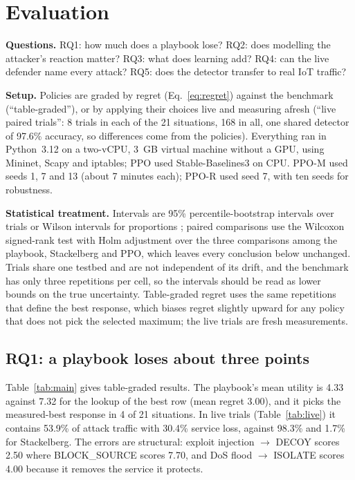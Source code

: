 \documentclass[conference]{IEEEtran}
\begin{document}
\section{Evaluation}
\label{sec:eval}
\textbf{Questions.} RQ1: how much does a playbook lose? RQ2: does modelling the attacker's reaction matter? RQ3: what does learning add? RQ4: can the live defender name every attack? RQ5: does the detector transfer to real IoT traffic?

\textbf{Setup.} Policies are graded by regret (Eq.~\ref{eq:regret}) against the benchmark (``table-graded''), or by applying their choices live and measuring afresh (``live paired trials'': 8 trials in each of the 21 situations, 168 in all, one shared detector of 97.6\% accuracy, so differences come from the policies). Everything ran in Python~3.12 on a two-vCPU, 3~GB virtual machine without a GPU, using Mininet, Scapy and iptables; PPO used Stable-Baselines3 on CPU. PPO-M used seeds 1, 7 and 13 (about 7 minutes each); PPO-R used seed 7, with ten seeds for robustness.

\textbf{Statistical treatment.} Intervals are 95\% percentile-bootstrap intervals over trials \cite{efron1993bootstrap} or Wilson intervals for proportions \cite{wilson1927probable}; paired comparisons use the Wilcoxon signed-rank test \cite{wilcoxon1945individual} with Holm adjustment \cite{holm1979simple} over the three comparisons among the playbook, Stackelberg and PPO, which leaves every conclusion below unchanged. Trials share one testbed and are not independent of its drift, and the benchmark has only three repetitions per cell, so the intervals should be read as lower bounds on the true uncertainty. Table-graded regret uses the same repetitions that define the best response, which biases regret slightly upward for any policy that does not pick the selected maximum; the live trials are fresh measurements.

\subsection{RQ1: a playbook loses about three points}
\label{sec:eval-rq1}
Table~\ref{tab:main} gives table-graded results. The playbook's mean utility is 4.33 against 7.32 for the lookup of the best row (mean regret 3.00), and it picks the measured-best response in 4 of 21 situations. In live trials (Table~\ref{tab:live}) it contains 53.9\% of attack traffic with 30.4\% service loss, against 98.3\% and 1.7\% for Stackelberg. The errors are structural: exploit injection $\to$ DECOY scores 2.50 where BLOCK\_SOURCE scores 7.70, and DoS flood $\to$ ISOLATE scores 4.00 because it removes the service it protects.
\end{document}
